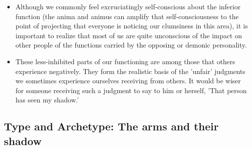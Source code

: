 \begin{itemize}
Beast is the demonic/daimonic personality, which in life, unlike the Beast at
the end of most versions of the fairy tale, does not transform into a handsome
prince. This most incorrigible of our function-attitudes stays a beast, but one
that to some extent can be tamed through the anima's solicitous and energetic
care.

\item

Although we commonly feel excruciatingly self-conscious about the inferior
function (the anima and animus can amplify that self-consciousness to the point
of projecting that everyone is noticing our clumsiness in this area), it is
important to realize that most of us are quite unconscious of the impact on
other people of the functions carried by the opposing or demonic personality.

\item

These less-inhibited parts of our functioning are among those that others
experience negatively. They form the realistic basis of the 'unfair' judgments
we sometimes experience ourselves receiving from others. It would be wiser for
someone receiving such a judgment to say to him or herself, 'That person has
seen my shadow.'

\end{itemize}

\subsection{Type and Archetype: The arms and their shadow}

